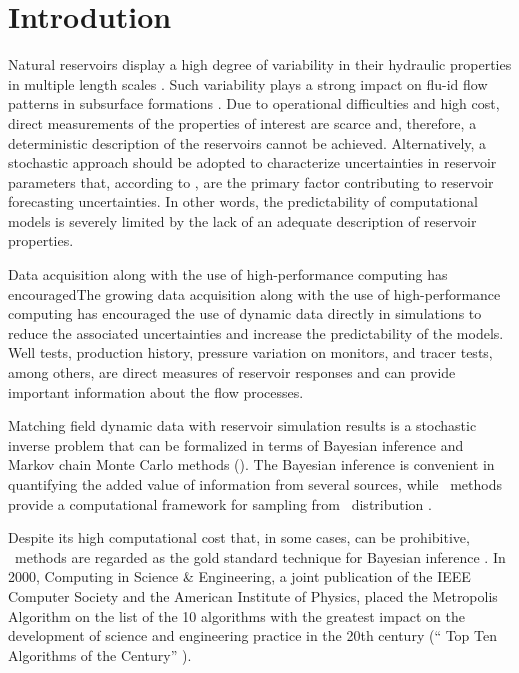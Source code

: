 \section{Introdution}
Natural reservoirs display a high degree of variability in their hydraulic properties in multiple length scales \citep{dagan89, gelhar93}.
Such variability plays a strong impact on flu-id flow patterns in subsurface formations \citep{glimm92}.
Due to operational difficulties and high cost, direct measurements of the properties of interest are scarce and, therefore, a deterministic description of the reservoirs cannot be achieved.
Alternatively, a stochastic approach should be adopted to characterize uncertainties in reservoir parameters that, according to \cite{efendiev2006},  are the primary factor contributing to reservoir forecasting uncertainties.
In other words, the predictability of computational models is severely limited by the lack of an adequate description of reservoir properties.

Data acquisition along with the use of high-performance computing has encouragedThe growing data acquisition along with the use of high-performance computing has encouraged the use of dynamic data directly in simulations to reduce the associated uncertainties and increase the predictability of the models.
Well tests, production history, pressure variation on monitors, and tracer tests, among others, are direct measures of reservoir responses and can provide important information about the flow processes.

Matching field dynamic data with reservoir simulation results is a stochastic inverse problem that can be formalized in terms of Bayesian inference and Markov chain Monte Carlo methods (\mcmc).
The Bayesian inference is convenient in quantifying the added value of information from several sources, while \mcmc\ methods provide a computational framework for sampling from \apost\ distribution \citep{casella05, liu2008}.

Despite its high computational cost that, in some cases, can be prohibitive, \mcmc\ methods are regarded as the gold standard technique for Bayesian inference \citep{Nemeth2021}.
In 2000, Computing in Science \& Engineering, a joint publication of the IEEE Computer Society and the American Institute of Physics, placed the Metropolis Algorithm on the list of the 10 algorithms with the greatest impact on the development of science and engineering practice in the 20th century (“ Top Ten Algorithms of the Century”  \citep{top10}).

